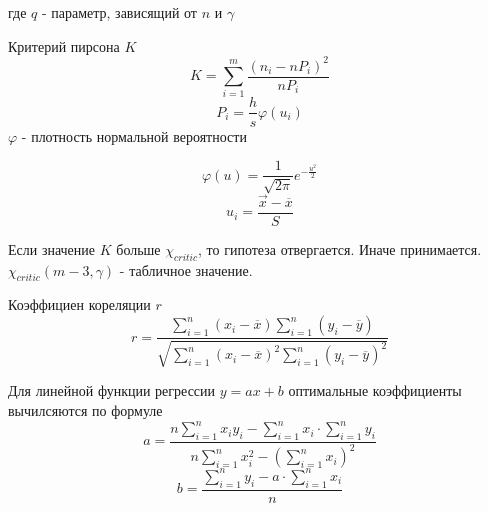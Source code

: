 \documentclass[oneside,final,14pt]{extreport}
\begin{document}
где $q$ - параметр, зависящий от  $n$ и $\gamma$

Критерий пирсона $K$
\begin{equation}
K
=
\sum\limits_{i=1}^m
\frac{(n_i-nP_i)^2}{nP_i}
\end{equation}
\begin{equation}
P_i
=
\frac{h}{s}
\varphi(u_i)
\end{equation}
$\varphi$ - плотность нормальной вероятности

\begin{equation}
\varphi(u)
=
\frac{1}{\sqrt{2\pi}}
e^{-\frac{u^2}{2}}
\end{equation}
\begin{equation}
u_i
=
\frac{
\overrightarrow{x}
-
\overline{x}
}
{S}
\end{equation}

Если значение  $K$ больше $\chi_{critic}$, то гипотеза отвергается. Иначе принимается. $\chi_{critic}(m-3,\gamma)$ - табличное значение.

Коэффициен кореляции $r$
\begin{equation}
r
=
\frac{
\sum\limits_{i=1}^n (x_i - \overline{x})
\sum\limits_{i=1}^n (y_i - \overline{y})
}{
\sqrt{
\sum\limits_{i=1}^n (x_i - \overline{x})^2
\sum\limits_{i=1}^n (y_i - \overline{y})^2
}
}
\end{equation}

Для  линейной функции регрессии $y = ax + b$ оптимальные коэффициенты вычилсяются по формуле
\begin{equation}
a
=
\frac{n
\sum\limits_{i=1}^n x_i y_i -
\sum\limits_{i=1}^n x_i
\cdot
\sum\limits_{i=1}^n y_i}{
n
\sum\limits_{i=1}^n x_i^2
-
(
\sum\limits_{i=1}^n x_i
)^2}
\end{equation}
\begin{equation}
b
=
\frac{
\sum\limits_{i=1}^n y_i
- a \cdot 
\sum\limits_{i=1}^n x_i}{n}
\end{equation}
\end{document}

